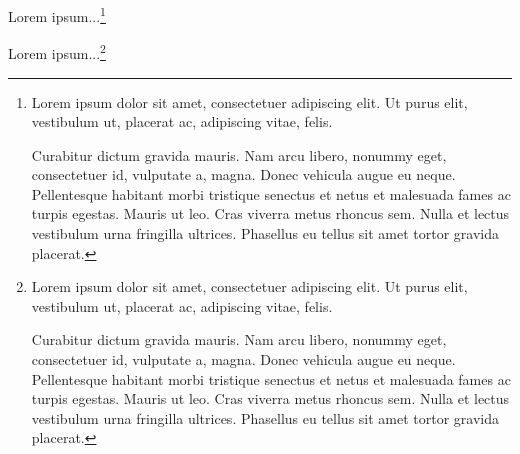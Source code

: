 \documentclass[11pt,oneside]{book}
\begin{document}
Lorem ipsum...\footnote{Lorem ipsum dolor sit amet, consectetuer adipiscing elit. Ut purus elit, vestibulum ut, placerat ac, adipiscing vitae, felis.

Curabitur dictum gravida mauris. Nam arcu libero, nonummy eget, consectetuer id, vulputate a, magna. Donec vehicula augue eu neque. Pellentesque habitant morbi tristique senectus et netus et malesuada fames ac turpis egestas. Mauris ut leo. Cras viverra metus rhoncus sem. Nulla et lectus vestibulum urna fringilla ultrices. Phasellus eu tellus sit amet tortor gravida placerat. }

Lorem ipsum...\footnote{Lorem ipsum dolor sit amet, consectetuer adipiscing elit. Ut purus elit, vestibulum ut, placerat ac, adipiscing vitae, felis.

Curabitur dictum gravida mauris. Nam arcu libero, nonummy eget, consectetuer id, vulputate a, magna. Donec vehicula augue eu neque. Pellentesque habitant morbi tristique senectus et netus et malesuada fames ac turpis egestas. Mauris ut leo. Cras viverra metus rhoncus sem. Nulla et lectus vestibulum urna fringilla ultrices. Phasellus eu tellus sit amet tortor gravida placerat. }
\end{document}
